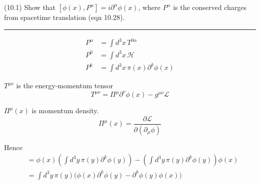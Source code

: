\documentclass[12pt]{article}
\begin{document}
(10.1)
Show that $[\phi(x),P^\alpha]=i\partial^\alpha\phi(x)$, where $P^\alpha$ is
the conserved charges from spacetime translation
(eqn 10.28).

\bigskip
\hrule

\bigskip
\begin{align*}
P^\alpha&=\int d^3x\,T^{0\alpha}
\tag{10.28}
\\
P^0&=\int d^3x\,\mathcal H
\tag{10.29}
\\
P^k&=\int d^3x\,\pi(x)\partial^k\phi(x)
\tag{10.30}
\end{align*}

$T^{\mu\nu}$ is the energy-momentum tensor
\begin{equation*}
T^{\mu\nu}=\Pi^\mu\partial^\nu\phi(x)-g^{\mu\nu}\mathcal L
\end{equation*}

$\Pi^\mu(x)$ is momentum density.
\begin{equation*}
\Pi^\mu(x)=\frac{\partial\mathcal L}{\partial(\partial_\mu\phi)}
\tag{10.10}
\end{equation*}

Hence
\begin{align*}
[\phi(x),P^k]
&=\phi(x)\left(\int d^3y\,\pi(y)\partial^k\phi(y)\right)
-\left(\int d^3y\,\pi(y)\partial^k\phi(y)\right)\phi(x)
\\
&=\int d^3y\,\pi(y)\bigg(\phi(x)\partial^k\phi(y)-\partial^k\phi(y)\phi(x)\bigg)
\end{align*}
\end{document}
